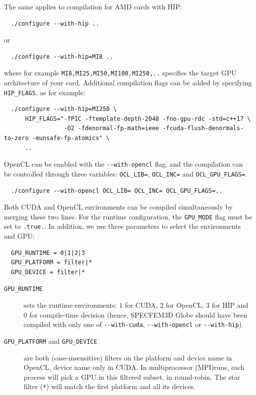 \noindent
The same applies to compilation for AMD cards with HIP:
{\small
\begin{verbatim}
  ./configure --with-hip ..
\end{verbatim}
}
or
{\small
\begin{verbatim}
  ./configure --with-hip=MI8 ..
\end{verbatim}
}
\noindent
where for example \texttt{MI8,MI25,MI50,MI100,MI250,..} specifies the target GPU architecture of your card.
Additional compilation flags can be added by specifying \texttt{HIP\_FLAGS}, as for example:
{\small
\begin{verbatim}
  ./configure --with-hip=MI250 \
      HIP_FLAGS="-fPIC -ftemplate-depth-2048 -fno-gpu-rdc -std=c++17 \
                 -O2 -fdenormal-fp-math=ieee -fcuda-flush-denormals-to-zero -munsafe-fp-atomics" \
      ..
\end{verbatim}
}


OpenCL can be enabled with the \texttt{-{}-with-opencl} flag, and the
compilation can be controlled through three variables: \texttt{OCL\_LIB=},
\texttt{OCL\_INC=} and \texttt{OCL\_GPU\_FLAGS=}.
{\small
\begin{verbatim}
  ./configure --with-opencl OCL_LIB= OCL_INC= OCL_GPU_FLAGS=..
\end{verbatim}
}


Both CUDA and OpenCL environments can be compiled simultaneously by merging these two lines.
For the runtime configuration, the \texttt{GPU\_MODE} flag must be set
to \texttt{.true.}. In addition, we use three parameters to select the
environments and GPU:
{\small
\begin{verbatim}
  GPU_RUNTIME = 0|1|2|3
  GPU_PLATFORM = filter|*
  GPU_DEVICE = filter|*
\end{verbatim}
}

\begin{description}
\item[\texttt{GPU\_RUNTIME}] sets the runtime environments: $1$ for CUDA, $2$ for OpenCL, $3$ for HIP
 and $0$ for compile-time decision (hence, SPECFEM3D Globe should
have been compiled with only one of \texttt{-{}-with-cuda}, \texttt{-{}-with-opencl} or \texttt{-{}-with-hip}).

\item[\texttt{GPU\_PLATFORM} and \texttt{GPU\_DEVICE}] are both (case-insensitive)
filters on the platform and device name in OpenCL, device name only in
CUDA. In multiprocessor (MPI)runs, each process will pick a GPU in
this filtered subset, in round-robin. The star filter (\texttt{*})
will match the first platform and all its devices.
\end{description}


